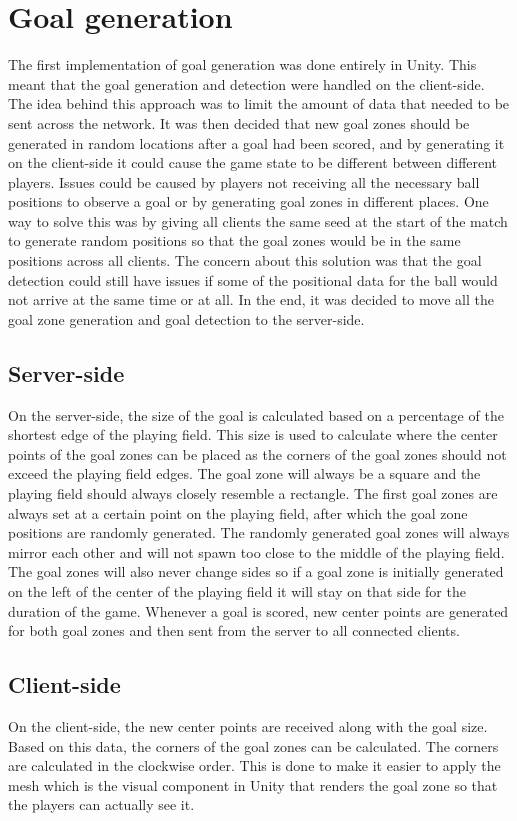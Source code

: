 \section{Goal generation}\label{subsec:goalrefactoring}
The first implementation of goal generation was done entirely in Unity.
This meant that the goal generation and detection were handled on the client-side.
The idea behind this approach was to limit the amount of data that needed to be sent across the network.
It was then decided that new goal zones should be generated in random locations after a goal had been scored, and by generating it on the client-side it could cause the game state to be different between different players.
Issues could be caused by players not receiving all the necessary ball positions to observe a goal or by generating goal zones in different places.
One way to solve this was by giving all clients the same seed at the start of the match to generate random positions so that the goal zones would be in the same positions across all clients.
The concern about this solution was that the goal detection could still have issues if some of the positional data for the ball would not arrive at the same time or at all.
In the end, it was decided to move all the goal zone generation and goal detection to the server-side.

\subsection{Server-side}
On the server-side, the size of the goal is calculated based on a percentage of the shortest edge of the playing field.
This size is used to calculate where the center points of the goal zones can be placed as the corners of the goal zones should not exceed the playing field edges.
The goal zone will always be a square and the playing field should always closely resemble a rectangle.
The first goal zones are always set at a certain point on the playing field, after which the goal zone positions are randomly generated.
The randomly generated goal zones will always mirror each other and will not spawn too close to the middle of the playing field.
The goal zones will also never change sides so if a goal zone is initially generated on the left of the center of the playing field it will stay on that side for the duration of the game.
Whenever a goal is scored, new center points are generated for both goal zones and then sent from the server to all connected clients.

\subsection{Client-side}
On the client-side, the new center points are received along with the goal size.
Based on this data, the corners of the goal zones can be calculated.
The corners are calculated in the clockwise order.
This is done to make it easier to apply the mesh which is the visual component in Unity that renders the goal zone so that the players can actually see it.
